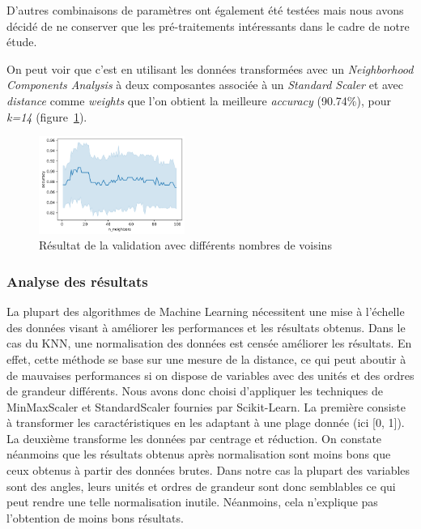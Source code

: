 \documentclass[twocolumn,10pt]{article}
\begin{document}
D'autres combinaisons de paramètres ont également été testées mais nous avons décidé de ne conserver que les pré-traitements intéressants dans le cadre de notre étude.

On peut voir que c'est en utilisant les données transformées avec un \textit{Neighborhood Components Analysis} à deux composantes associée à un \textit{Standard Scaler} et avec \textit{distance} comme \textit{weights} que l'on obtient la meilleure \textit{accuracy} (90.74\%), pour \textit{k=14} (figure~\ref{fig:KNN_cross_val}).

\begin{figure}[htbp]
    \begin{center}
        \includegraphics[width=0.425\textwidth]{figures/KNN_cross_val.png}
        \caption{\label{fig:KNN_cross_val}Résultat de la validation avec différents nombres de voisins}
    \end{center}
\end{figure}

\subsubsection{Analyse des résultats}

La plupart des algorithmes de Machine Learning nécessitent une mise à l'échelle des données visant à améliorer les performances et les résultats obtenus. Dans le cas du KNN, une normalisation des données est censée améliorer les résultats. En effet, cette méthode se base sur une mesure de la distance, ce qui peut aboutir à de mauvaises performances si on dispose de variables avec des unités et des ordres de grandeur différents.
Nous avons donc choisi d'appliquer les techniques de MinMaxScaler et StandardScaler fournies par Scikit-Learn. La première consiste à transformer les caractéristiques en les adaptant à une plage donnée (ici [0, 1]). La deuxième transforme les données par centrage et réduction. On constate néanmoins que les résultats obtenus après normalisation sont moins bons que ceux obtenus à partir des données brutes.
Dans notre cas la plupart des variables sont des angles, leurs unités et ordres de grandeur sont donc semblables ce qui peut rendre une telle normalisation inutile. Néanmoins, cela n'explique pas l'obtention de moins bons résultats.
\end{document}

